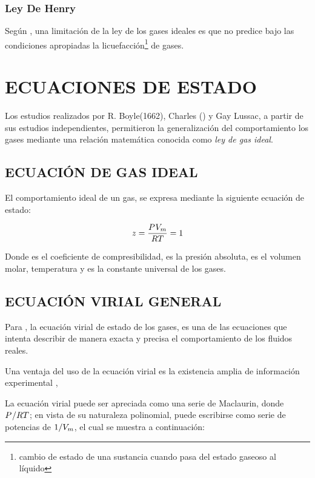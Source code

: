 \subsubsection*{Ley De Henry}

Según \parencite{Engel2019}, una limitación de la ley de los gases ideales es que no predice bajo las condiciones apropiadas la licuefacción\footnote{cambio de estado de una sustancia cuando pasa del estado gaseoso al líquido} de gases.



\section{ECUACIONES DE ESTADO}
    Los estudios realizados por R. Boyle(1662), Charles () y Gay Lussac, a partir de sus estudios independientes, permitieron la generalización del comportamiento los gases mediante una relación matemática conocida como {\it ley de gas ideal}. 

\subsection{ECUACIÓN DE GAS IDEAL}
    El comportamiento ideal de un gas, se expresa mediante la siguiente ecuación de estado:

    \begin{equation}
       z = \frac{P_{}^{} V_m}{R T} = 1 
    \end{equation}

    Donde {\zFactor} es el coeficiente de compresibilidad, {\pressure{}{}} es la presión absoluta, {\Vmolar} es el volumen molar, {\T{}} temperatura y {\univConstGasEos} es la constante universal de los gases.

\subsection{ECUACIÓN VIRIAL GENERAL}
    \label{cap2:subsec:tagEqnvirial}
    Para \parencite[p. 37]{Sengers1987equations}, la ecuación virial de estado de los gases, es una de las ecuaciones que intenta describir de manera exacta y precisa el comportamiento de los fluidos reales. 

    Una ventaja del uso de la ecuación virial es la existencia amplia de información experimental \Parencite[p. 38]{Sengers1987equations}, 

    La ecuación virial puede ser apreciada como una serie de Maclaurin, donde ${P_{}^{}{}{}}/{R T}$; en vista de su naturaleza polinomial, puede escribirse como serie de potencias de $1/V_m$, el cual se muestra a continuación:

